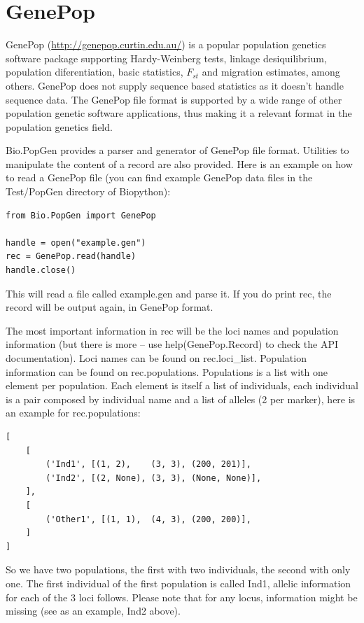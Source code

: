 \documentclass{report}
\begin{document}
\section{GenePop}

GenePop (\url{http://genepop.curtin.edu.au/}) is a popular population
genetics software package supporting Hardy-Weinberg tests, linkage
desiquilibrium, population diferentiation, basic statistics, $F_{st}$ and
migration estimates, among others. GenePop does not supply sequence
based statistics as it doesn't handle sequence data.
The GenePop file format is supported by a wide range of other population
genetic software applications, thus making it a relevant format in the
population genetics field.

Bio.PopGen provides a parser and generator of GenePop file format.
Utilities to manipulate the content of a record are also provided.
Here is an example on how to read a GenePop file (you can find
example GenePop data files in the Test/PopGen directory of Biopython):

\begin{verbatim}
from Bio.PopGen import GenePop

handle = open("example.gen")
rec = GenePop.read(handle)
handle.close()
\end{verbatim}

This will read a file called example.gen and parse it. If you
do print rec, the record will be output again, in GenePop format.

The most important information in rec will be the loci names and
population information (but there is more -- use help(GenePop.Record)
to check the API documentation). Loci names can be found on rec.loci\_list.
Population information can be found on rec.populations.
Populations is a list with one element per population. Each element is itself
a list of individuals, each individual is a pair composed by individual
name and a list of alleles (2 per marker), here is an example for
rec.populations:

\begin{verbatim}
[
    [
        ('Ind1', [(1, 2),    (3, 3), (200, 201)],
        ('Ind2', [(2, None), (3, 3), (None, None)],
    ],
    [
        ('Other1', [(1, 1),  (4, 3), (200, 200)],
    ]
]
\end{verbatim}

So we have two populations, the first with two individuals, the
second with only one. The first individual of the first
population is called Ind1, allelic information for each of
the 3 loci follows. Please note that for any locus, information
might be missing (see as an example, Ind2 above).
\end{document}
